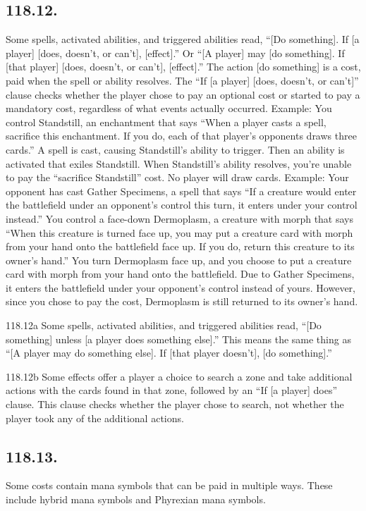 \subsection*{118.12.}
Some spells, activated abilities, and triggered abilities read, “[Do something]. If [a player] [does, doesn’t, or can’t], [effect].” Or “[A player] may [do something]. If [that player] [does, doesn’t, or can’t], [effect].” The action [do something] is a cost, paid when the spell or ability resolves. The “If [a player] [does, doesn’t, or can’t]” clause checks whether the player chose to pay an optional cost or started to pay a mandatory cost, regardless of what events actually occurred.
Example: You control Standstill, an enchantment that says “When a player casts a spell, sacrifice this enchantment. If you do, each of that player’s opponents draws three cards.” A spell is cast, causing Standstill’s ability to trigger. Then an ability is activated that exiles Standstill. When Standstill’s ability resolves, you’re unable to pay the “sacrifice Standstill” cost. No player will draw cards.
Example: Your opponent has cast Gather Specimens, a spell that says “If a creature would enter the battlefield under an opponent’s control this turn, it enters under your control instead.” You control a face-down Dermoplasm, a creature with morph that says “When this creature is turned face up, you may put a creature card with morph from your hand onto the battlefield face up. If you do, return this creature to its owner’s hand.” You turn Dermoplasm face up, and you choose to put a creature card with morph from your hand onto the battlefield. Due to Gather Specimens, it enters the battlefield under your opponent’s control instead of yours. However, since you chose to pay the cost, Dermoplasm is still returned to its owner’s hand.

118.12a Some spells, activated abilities, and triggered abilities read, “[Do something] unless [a player does something else].” This means the same thing as “[A player may do something else]. If [that player doesn’t], [do something].”

118.12b Some effects offer a player a choice to search a zone and take additional actions with the cards found in that zone, followed by an “If [a player] does” clause. This clause checks whether the player chose to search, not whether the player took any of the additional actions.

\subsection*{118.13.}
Some costs contain mana symbols that can be paid in multiple ways. These include hybrid mana symbols and Phyrexian mana symbols.

